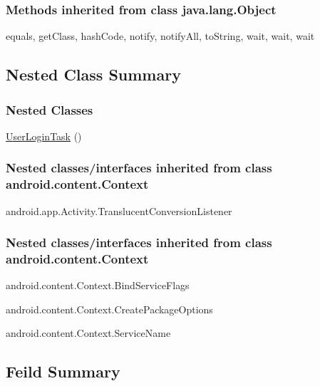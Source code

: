 \subsubsection{Methods inherited from class java.lang.Object}

equals, getClass, hashCode, notify, notifyAll, toString, wait, wait, wait\\





\subsection{Nested Class Summary}

\subsubsection{Nested Classes}
\begin{DoxyCompactItemize}
\item 
\hyperlink{class_ 	LoginActivity.Android.UserLoginTask}{UserLoginTask} ()
\end{DoxyCompactItemize} 

\subsubsection{Nested classes/interfaces inherited from class android.content.Context}
\begin{DoxyCompactItemize}
\item android.app.Activity.TranslucentConversionListener
\end{DoxyCompactItemize}

\subsubsection{Nested classes/interfaces inherited from class android.content.Context}
\begin{DoxyCompactItemize}
\item android.content.Context.BindServiceFlags
\item android.content.Context.CreatePackageOptions
\item android.content.Context.ServiceName
\end{DoxyCompactItemize} 

\subsection{Feild Summary}

